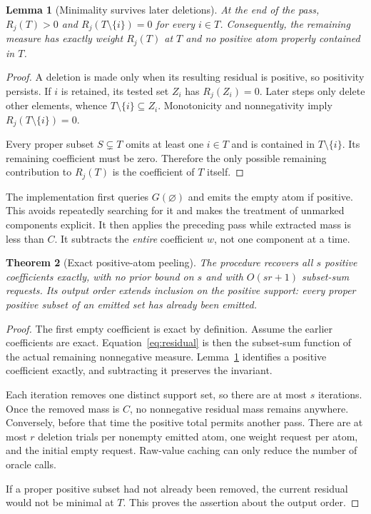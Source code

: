 \documentclass[11pt,letterpaper]{article}
\newtheorem{theorem}{Theorem}[section]
\newtheorem{lemma}[theorem]{Lemma}
\theoremstyle{definition}\newtheorem{definition}[theorem]{Definition}
\theoremstyle{remark}\newtheorem{remark}[theorem]{Remark}
\begin{document}
\begin{lemma}[Minimality survives later deletions]
\label{lem:minimal}
At the end of the pass, $R_j(T)>0$ and $R_j(T\setminus\{i\})=0$ for every $i\in T$. Consequently, the remaining measure has exactly weight $R_j(T)$ at $T$ and no positive atom properly contained in $T$.
\end{lemma}
\begin{proof}
A deletion is made only when its resulting residual is positive, so positivity persists. If $i$ is retained, its tested set $Z_i$ has $R_j(Z_i)=0$. Later steps only delete other elements, whence
$T\setminus\{i\}\subseteq Z_i$. Monotonicity and nonnegativity imply
$R_j(T\setminus\{i\})=0$.

Every proper subset $S\subsetneq T$ omits at least one $i\in T$ and is contained in $T\setminus\{i\}$. Its remaining coefficient must be zero. Therefore the only possible remaining contribution to $R_j(T)$ is the coefficient of $T$ itself.
\end{proof}

The implementation first queries $G(\varnothing)$ and emits the empty atom if positive. This avoids repeatedly searching for it and makes the treatment of unmarked components explicit. It then applies the preceding pass while extracted mass is less than $C$. It subtracts the \emph{entire} coefficient $w$, not one component at a time.

\begin{theorem}[Exact positive-atom peeling]
\label{thm:peel}
The procedure recovers all $s$ positive coefficients exactly, with no prior bound on $s$ and with $O(sr+1)$ subset-sum requests. Its output order extends inclusion on the positive support: every proper positive subset of an emitted set has already been emitted.
\end{theorem}
\begin{proof}
The first empty coefficient is exact by definition. Assume the earlier coefficients are exact. Equation~\eqref{eq:residual} is then the subset-sum function of the actual remaining nonnegative measure. Lemma~\ref{lem:minimal} identifies a positive coefficient exactly, and subtracting it preserves the invariant.

Each iteration removes one distinct support set, so there are at most $s$ iterations. Once the removed mass is $C$, no nonnegative residual mass remains anywhere. Conversely, before that time the positive total permits another pass. There are at most $r$ deletion trials per nonempty emitted atom, one weight request per atom, and the initial empty request. Raw-value caching can only reduce the number of oracle calls.

If a proper positive subset had not already been removed, the current residual would not be minimal at $T$. This proves the assertion about the output order.
\end{proof}
\end{document}
